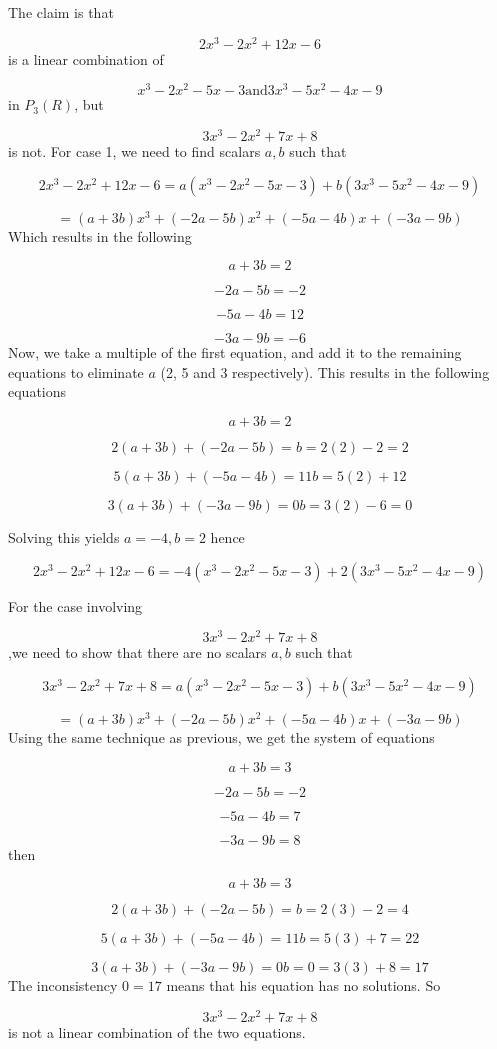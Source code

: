 \begin{example}
		The claim is that

\[
2x^{3} - 2x^{2} + 12x - 6
\]
		is a linear combination of

\[
x^{3} - 2x^{2} - 5x - 3 \text{and} 3x^{3} - 5x^{2} - 4x - 9
\]
		in \(P_{3}(R)\), but

\[
3x^{3} - 2x^{2} + 7x + 8
\]
		is not. For case 1, we need to find scalars \(a,b\) such that

\[
2x^{3} - 2x^{2} + 12x - 6 = a(x^{3} - 2x^{2} - 5x - 3) + b(3x^{3} - 5x^{2} - 4x - 9)
\]

\[
= (a + 3b)x^{3} + (-2a - 5b)x^{2} + (-5a - 4b)x + (-3a - 9b)
\]
		Which results in the following

\[
a + 3b = 2
\]

\[
-2a - 5b = -2
\]

\[
-5a - 4b = 12
\]

\[
-3a - 9b = -6
\]
		Now, we take a multiple of the first equation, and add it to the remaining equations to eliminate \(a\) (2, 5 and 3 respectively). This results in the following equations

\[
a + 3b = 2
\]

\[
2(a + 3b) + (-2a - 5b) = b = 2(2) - 2 = 2
\]

\[
5(a + 3b) + (-5a - 4b) = 11b = 5(2) + 12
\]

\[
3(a + 3b) + (-3a - 9b) = 0b = 3(2) - 6 = 0
\]

		Solving this yields \(a = -4, b = 2\) hence

\[
2x^{3} - 2x^{2} + 12x - 6 = -4(x^{3} - 2x^{2} - 5x - 3) + 2(3x^{3} - 5x^{2} - 4x - 9)
\]

		For the case involving

\[
3x^{3} - 2x^{2} + 7x + 8
\]
,we need to show that there are no scalars \(a,b\) such that

\[
3x^{3} - 2x^{2} + 7x + 8 = a(x^{3} - 2x^{2} - 5x - 3) + b(3x^{3} - 5x^{2} - 4x - 9)
\]

\[
= (a + 3b)x^{3} + (-2a - 5b)x^{2} + (-5a - 4b)x + (-3a - 9b)
\]
		Using the same technique as previous, we get the system of equations

\[
a + 3b = 3
\]

\[
-2a - 5b = -2
\]

\[
-5a - 4b = 7
\]

\[
-3a - 9b = 8
\]
		then

\[
a + 3b = 3
\]

\[
2(a + 3b) + (-2a - 5b) = b = 2(3) - 2 = 4
\]

\[
5(a+3b) + (-5a-4b) = 11b = 5(3)+7 = 22
\]

\[
3(a+3b) + (-3a-9b) = 0b = 0 = 3(3) + 8 = 17
\]
		The inconsistency \(0 = 17\) means that his equation has no solutions. So

\[
3x^{3}-2x^{2}+7x+8
\]
		is not a linear combination of the two equations.

\end{example}


